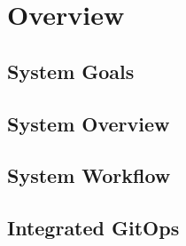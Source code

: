 
\chapter{Overview}\label{chapter:overview}

\section{System Goals}

\section{System Overview}

\section{System Workflow}

\section{Integrated GitOps}